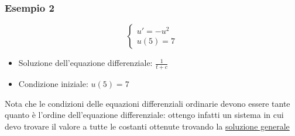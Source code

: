 \subsubsection*{Esempio 2}
\[
	\begin{cases}
		u' = - u^2 \\
		u\left( 5 \right) = 7
	\end{cases}
\]
\begin{itemize}
	\item Soluzione dell'equazione differenziale: $ \frac{1}{t + c} $
	\item Condizione iniziale: $ u\left( 5 \right) = 7 $
\end{itemize}
\hr
Nota che le condizioni delle equazioni differenziali ordinarie devono essere tante quanto è l'ordine dell'equazione differenziale: ottengo infatti un sistema in cui devo trovare il valore a tutte le costanti ottenute trovando la \underline{soluzione generale}
